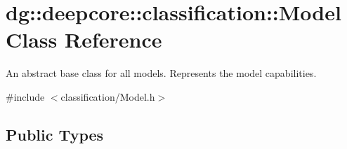 \hypertarget{classdg_1_1deepcore_1_1classification_1_1_model}{}\section{dg\+:\+:deepcore\+:\+:classification\+:\+:Model Class Reference}
\label{classdg_1_1deepcore_1_1classification_1_1_model}


An abstract base class for all models. Represents the model capabilities.  




{\ttfamily \#include $<$classification/\+Model.\+h$>$}

\subsection*{Public Types}

